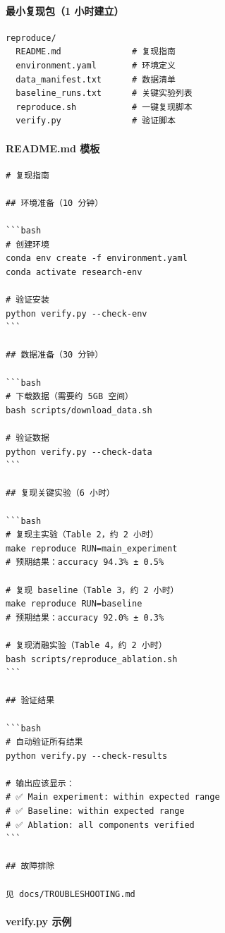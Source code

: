 \paragraph{最小复现包（1 小时建立）}

\begin{verbatim}
reproduce/
  README.md              # 复现指南
  environment.yaml       # 环境定义
  data_manifest.txt      # 数据清单
  baseline_runs.txt      # 关键实验列表
  reproduce.sh           # 一键复现脚本
  verify.py              # 验证脚本
\end{verbatim}

\paragraph{README.md 模板}

\begin{verbatim}
# 复现指南

## 环境准备（10 分钟）

```bash
# 创建环境
conda env create -f environment.yaml
conda activate research-env

# 验证安装
python verify.py --check-env
```

## 数据准备（30 分钟）

```bash
# 下载数据（需要约 5GB 空间）
bash scripts/download_data.sh

# 验证数据
python verify.py --check-data
```

## 复现关键实验（6 小时）

```bash
# 复现主实验（Table 2，约 2 小时）
make reproduce RUN=main_experiment
# 预期结果：accuracy 94.3% ± 0.5%

# 复现 baseline（Table 3，约 2 小时）
make reproduce RUN=baseline
# 预期结果：accuracy 92.0% ± 0.3%

# 复现消融实验（Table 4，约 2 小时）
bash scripts/reproduce_ablation.sh
```

## 验证结果

```bash
# 自动验证所有结果
python verify.py --check-results

# 输出应该显示：
# ✅ Main experiment: within expected range
# ✅ Baseline: within expected range
# ✅ Ablation: all components verified
```

## 故障排除

见 docs/TROUBLESHOOTING.md
\end{verbatim}

\paragraph{verify.py 示例}

